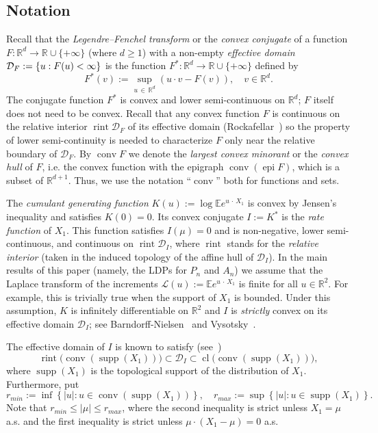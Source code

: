 \documentclass[AHL,Unicode,published]{cedram}
\DeclareMathOperator{\conv}{conv}
\DeclareMathOperator{\cl}{cl}
\DeclareMathOperator{\rint}{rint}
\DeclareMathOperator{\epi}{epi}
\newcommand{\Rbb}{\mathbb{R}}
\newcommand{\E}{\mathbb{E}}
\newcommand{\Dcl}{\mathcal{D}}
\newcommand{\Lcl}{\mathcal{L}}
\newcommand{\supp}{\mathop{\mathrm{supp}}\nolimits}
\begin{document}
\subsection{Notation} \label{sec: notation}
Recall that the \emph{Legendre--Fenchel transform} or the \emph{convex conjugate} of a function $F:\Rbb^d \to \Rbb \cup \{+ \infty\}$ (where $d \ge 1$) with a non-empty \emph{effective domain} $\Dcl_F:=\linebreak\{u: F(u) < \infty\}$ is the function $F^*:\Rbb^d \to \Rbb \cup \{+ \infty\}$ defined by
\[
F^*(v):= \sup_{u\,\in\,\Rbb^d} \left(u \cdot v - F(v) \right), \quad v \in \Rbb^d.
\]
The conjugate function $F^*$ is convex and lower semi-continuous on $\Rbb^d$; $F$ itself does not need to be convex. Recall that any convex function $F$ is continuous on the relative interior $\rint \Dcl_F$ of its effective domain (Rockafellar~\cite[Theorem~10.1]{Rockafellar}) so the property of lower semi-continuity is needed to characterize $F$ only near the relative boundary of $\Dcl_F$. By $\conv F$ we denote the \emph{largest convex minorant} or the \emph{convex hull} of $F$, i.e. the convex function with the epigraph $\conv(\epi F)$, which is a subset of $\Rbb^{d+1}$. Thus, we use the notation ``$\conv$'' both for functions and sets.

The \emph{cumulant generating function} $K(u):=\log \E e^{u\, \cdot\,X_1}$ is convex by Jensen's inequality and satisfies $K(0)=0$. Its convex conjugate $I:=K^*$ is the \emph{rate function} of $X_1$. This function satisfies $I(\mu)=0$ and is non-negative, lower semi-continuous, and continuous on $\rint \Dcl_I$, where $\rint$ stands for the \emph{relative interior} (taken in the induced topology of the affine hull of $\Dcl_I$). In the main results of this paper (namely, the LDPs for $P_n$ and $A_n$) we assume that the Laplace transform of the increments $\Lcl(u):= \E e^{u\,\cdot \,X_1}$ is finite for all $u\in\Rbb^2$. For example, this is trivially true when the support of $X_1$ is bounded. Under this assumption, $K$ is infinitely differentiable on $\Rbb^2$ and $I$ is \emph{strictly} convex on its effective domain $\Dcl_I$; see Barndorff-Nielsen~\cite[Corollary~7.1]{B-N} and Vysotsky~\cite[Corollary~2.12]{VysotskyStrict}.

The effective domain of $I$ is known to satisfy (see~\cite[Proposition~1.1.a]{VysotskyStrict})
\begin{equation}\label{eq: D_I inclusions}
\rint\big(\conv(\supp(X_1))\big) \subset \Dcl_{I} \subset \cl\big(\conv(\supp(X_1))\big),
\end{equation}
where $\supp(X_1)$ is the topological support of the distribution of $X_1$. Furthermore, put
\[
r_{min}:= \inf \left\{|u|: u \in \conv(\supp(X_1)) \right\}, \quad r_{max}:= \sup \left\{|u|: u \in \supp(X_1) \right\}.
\]
Note that $r_{min} \le |\mu| \le r_{max}$, where the second inequality is strict unless $X_1 = \mu$ a.s. and the first inequality is strict unless $\mu \cdot (X_1 - \mu) = 0$ a.s.
\end{document}
